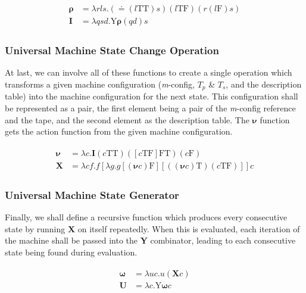 \documentclass[Master.tex]{subfiles}
\begin{document}
\begin{gather*}
\begin{aligned}
\bm{\rho} &= \lambda rls.(\bm{\doteq}(l\bm{\mathrm{TT}})s)(l\bm{\mathrm{TF}})(r(l\bm{\mathrm{F}})s)\\
\bm{I} &= \lambda qsd.\bm{\mathrm{Y}\rho}(qd)s
\end{aligned}
\end{gather*}

\subsubsection{Universal Machine State Change Operation}

At last, we can involve all of these functions to create a single operation which transforms a given machine configuration (\textit{m}-config, $T_p$ \& $T_s$, and the description table) into the machine configuration for the next state. This configuration shall be represented as a pair, the first element being a pair of the \textit{m}-config reference and the tape, and the second element as the description table. The $\bm{\nu}$ function gets the action function from the given machine configuration.

\begin{gather*}
\begin{aligned}
\bm{\nu} &= \lambda c.\bm{I}(c\bm{\mathrm{TT}})([c\bm{\mathrm{TF}}]\bm{\mathrm{FT}})(c\bm{\mathrm{F}})\\
\bm{X} &= \lambda cf.f[\lambda g.g[(\bm{\nu}c)\bm{\mathrm{F}}][((\bm{\nu}c)\bm{\mathrm{T}})(c\bm{\mathrm{TF}})]]c
\end{aligned}
\end{gather*}

\subsubsection{Universal Machine State Generator}

Finally, we shall define a recursive function which produces every consecutive state by running $\bm{X}$ on itself repeatedly. When this is evaluated, each iteration of the machine shall be passed into the \textbf{Y} combinator, leading to each consecutive state being found during evaluation.

\begin{gather*}
\begin{aligned}
\bm{\omega} &= \lambda uc.u(\bm{X}c) \\
\bm{U} &= \lambda c.\bm{\mathrm{Y}}\bm{\omega}c
\end{aligned}
\end{gather*}
\end{document}
